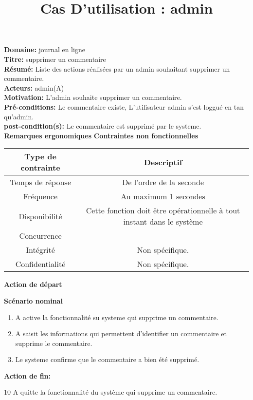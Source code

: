 \documentclass[a4paper,10pt]{article}
\title{Cas D'utilisation : admin}
\author{}
\begin{document}
\maketitle



\textbf{Domaine:} journal en ligne\\
\textbf{Titre:} supprimer un commentaire\\
\textbf{Résumé:} Liste des actions réalisées par un admin souhaitant supprimer un commentaire.\\
\textbf{Acteurs:} admin(A)\\
\textbf{Motivation:} L'admin souhaite supprimer un commentaire.\\
\textbf{Pré-conditions:} Le commentaire existe, L'utilisateur admin s'est loggué en tan qu'admin.\\
\textbf{post-condition(s):} Le commentaire est supprimé par le systeme.\\

\textbf{Remarques ergonomiques}
\textbf{Contraintes non fonctionnelles}
\begin{center}
  \begin{tabular}{|c|c|}
\hline
   \textbf{Type de contrainte}&\textbf{Descriptif}\\
\hline
Temps de réponse&De l'ordre de la seconde\\
\hline
Fréquence & Au maximum 1 secondes\\
\hline
Disponibilité & Cette fonction doit être opérationnelle à tout instant dans le système\\
\hline
Concurrence&\\
\hline
Intégrité&Non spécifique.\\
\hline
Confidentialité& Non spécifique.\\
\hline

  \end{tabular}
\end{center}

\textbf{Action de départ}

\textbf{Scénario nominal}
\begin{enumerate}
\item A active la fonctionnalité su systeme qui supprime un commentaire.
\item A saisit les informations qui permettent d'identifier un commentaire et supprime le commentaire.
\item Le systeme confirme que le commentaire a bien été supprimé.
\end{enumerate}

\textbf{Action de fin:}

10 A quitte la fonctionnalité du système qui supprime un commentaire.
\end{document}
